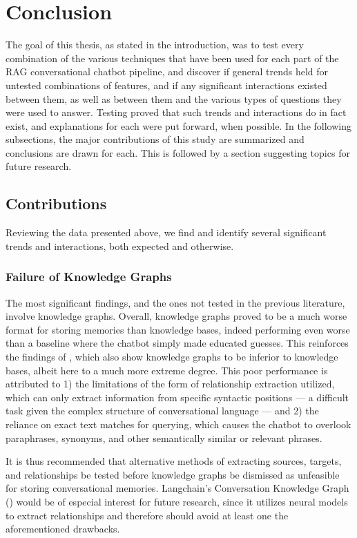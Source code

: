 \section{Conclusion}

The goal of this thesis, as stated in the introduction, was to test every combination of the various techniques that have been used for each part of the RAG conversational chatbot pipeline, and discover if general trends held for untested combinations of features, and if any significant interactions existed between them, as well as between them and the various types of questions they were used to answer. Testing proved that such trends and interactions do in fact exist, and explanations for each were put forward, when possible. In the following subsections, the major contributions of this study are summarized and conclusions are drawn for each. This is followed by a section suggesting topics for future research.


\subsection{Contributions}

Reviewing the data presented above, we find and identify several significant trends and interactions, both expected and otherwise. 


\subsubsection{Failure of Knowledge Graphs}

The most significant findings, and the ones not tested in the previous literature, involve knowledge graphs. Overall, knowledge graphs proved to be a much worse format for storing memories than knowledge bases, indeed performing even worse than a baseline where the chatbot simply made educated guesses. This reinforces the findings of \cite{Sanmartin2024}, which also show knowledge graphs to be inferior to knowledge bases, albeit here to a much more extreme degree. This poor performance is attributed to 1) the limitations of the form of relationship extraction utilized, which can only extract information from specific syntactic positions — a difficult task given the complex structure of conversational language — and 2) the reliance on exact text matches for querying, which causes the chatbot to overlook paraphrases, synonyms, and other semantically similar or relevant phrases. 

It is thus recommended that alternative methods of extracting sources, targets, and relationships be tested before knowledge graphs be dismissed as unfeasible for storing conversational memories. Langchain's Conversation Knowledge Graph (\cite{Langchain}) would be of especial interest for future research, since it utilizes neural models to extract relationships and therefore should avoid at least one the aforementioned drawbacks.


